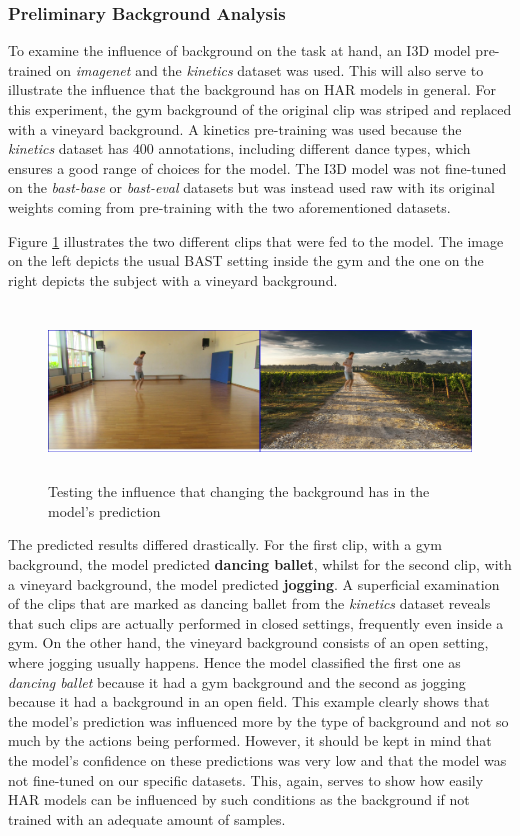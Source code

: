 \documentclass[extern,palatino]{cgMA}
\begin{document}
\subsubsection{Preliminary Background Analysis}
\label{research_question_5_1}

To examine the influence of background on the task at hand, an I3D model pre-trained on \textit{imagenet} and the \textit{kinetics} dataset was used. This will also serve to illustrate the influence that the background has on HAR models in general. For this experiment, the gym background of the original clip was striped and replaced with a vineyard background. A kinetics pre-training was used because the \textit{kinetics} dataset has $400$ annotations, including different dance types, which ensures a good range of choices for the model. The I3D model was not fine-tuned on the \textit{bast-base} or \textit{bast-eval} datasets but was instead used raw with its original weights coming from pre-training with the two aforementioned datasets. 

Figure \ref{fig:background_change_influence} illustrates the two different clips that were fed to the model. The image on the left depicts the usual BAST setting inside the gym and the one on the right depicts the subject with a vineyard background.

\begin{figure}[h]
\center
\includegraphics[height={130pt}, width={400pt}]{Thesis/images/background_influence_1.jpg}
\caption{Testing the influence that changing the background has in the model's prediction}
\label{fig:background_change_influence}
\end{figure}

\bigskip
\noindent The predicted results differed drastically. For the first clip, with a gym background, the model predicted \textbf{dancing ballet}, whilst for the second clip, with a vineyard background, the model predicted \textbf{jogging}. A superficial examination of the clips that are marked as dancing ballet from the \textit{kinetics} dataset reveals that such clips are actually performed in closed settings, frequently even inside a gym. On the other hand, the vineyard background consists of an open setting, where jogging usually happens. Hence the model classified the first one as \textit{dancing ballet} because it had a gym background and the second as jogging because it had a background in an open field. This example clearly shows that the model's prediction was influenced more by the type of background and not so much by the actions being performed. However, it should be kept in mind that the model's confidence on these predictions was very low and that the model was not fine-tuned on our specific datasets. This, again, serves to show how easily HAR models can be influenced by such conditions as the background if not trained with an adequate amount of samples.
\end{document}

